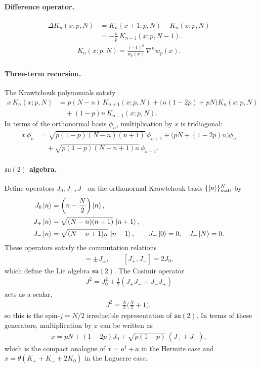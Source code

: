 \documentclass[a4paper,11pt]{article}
\numberwithin{equation}{section}
\theoremstyle{plain}
\theoremstyle{definition}
\theoremstyle{remark}
\newcommand{\1}{\ensuremath{\mathds{1}}\xspace}
\begin{document}
\paragraph{Difference operator.}
\begin{align}
\Delta K_n(x;p,N)
&=K_n(x+1;p,N)-K_n(x;p,N) \\
&=-\frac{n}{p}\,K_{n-1}(x;p,N-1).
\end{align}
\begin{align}
K_n(x;p,N)=\frac{(-1)^n}{w_p(x)}\,\nabla^n w_p(x).
\end{align}
\paragraph{Three-term recursion.}
The Krawtchouk polynomials satisfy
\begin{align}
x\,K_n(x;p,N)
&=
p(N-n)\,K_{n+1}(x;p,N)
+
\big(n(1-2p)+pN\big)K_n(x;p,N) \\
&\quad
+(1-p)n\,K_{n-1}(x;p,N).
\end{align}
In terms of the orthonormal basis $\phi_n$, multiplication by $x$ is tridiagonal:
\begin{align}
x\,\phi_n
&=
\sqrt{p(1-p)(N-n)(n+1)}\,\phi_{n+1}
+
\big(pN+(1-2p)n\big)\phi_n \\
&\quad
+
\sqrt{p(1-p)(N-n+1)n}\,\phi_{n-1}.
\end{align}

\paragraph{$\mathfrak{su}(2)$ algebra.}
Define operators $J_0,J_+,J_-$ on the orthonormal Krawtchouk basis
$\{\ket{n}\}_{n=0}^N$ by
\begin{align}
J_0\ket{n} &= \left(n-\frac{N}{2}\right)\ket{n},\\
J_+\ket{n} &= \sqrt{(N-n)(n+1)}\,\ket{n+1},\\
J_-\ket{n} &= \sqrt{(N-n+1)n}\,\ket{n-1},
\qquad J_-\ket{0}=0,\quad J_+\ket{N}=0.
\end{align}
These operators satisfy the commutation relations
\begin{align}
[J_0,J_\pm]=\pm J_\pm,
\qquad
[J_+,J_-]=2J_0,
\end{align}
which define the Lie algebra $\mathfrak{su}(2)$.
The Casimir operator
\begin{align}
J^2
=
J_0^2+\frac12(J_+J_-+J_-J_+)
\end{align}
acts as a scalar,
\begin{align}
J^2=\frac{N}{2}\Big(\frac{N}{2}+1\Big),
\end{align}
so this is the spin-$j=N/2$ irreducible representation of $\mathfrak{su}(2)$.
In terms of these generators, multiplication by $x$ can be written as
\begin{align}
x
=
pN
+
(1-2p)J_0
+
\sqrt{p(1-p)}\,(J_+ + J_-),
\end{align}
which is the compact analogue of $x=a^\dagger+a$ in the Hermite case and
$x=\theta(K_++K_-+2K_0)$ in the Laguerre case.
\end{document}
